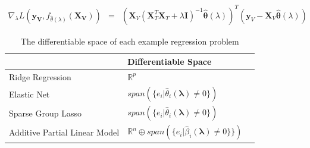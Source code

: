 \documentclass[10pt,letterpaper]{article}
\begin{document}
\begin{equation}
\begin{array} {lcl}
\nabla_{\lambda} L(\boldsymbol{y_V}, f_{\hat \theta(\lambda)}(\boldsymbol{X_V}))
&=& (\boldsymbol{X}_V(\boldsymbol{X}_T^T \boldsymbol{X}_T + \lambda \boldsymbol{I})^{-1}
\hat{\boldsymbol{\theta}}(\lambda))^T(\boldsymbol{y}_V - \boldsymbol{X}_V \hat{\boldsymbol{\theta}}(\lambda))
\end{array}
\end{equation}

\begin{table} 
\begin{center}

\begin{tabular}{| l | l | l | }
\hline
 &  Differentiable Space \\
\hline
Ridge Regression & $\mathbb{R}^p$\\
\hline
Elastic Net & $span(\{e_i | \hat{\theta}_i\left(\boldsymbol{\lambda}\right) \ne 0 \})$\\
\hline
Sparse Group Lasso & $span(\{e_i | \hat{\theta}_i\left(\boldsymbol{\lambda}\right) \ne 0 \})$ \\
\hline
Additive Partial Linear Model & $\mathbb{R}^{n} \oplus span(\{e_i | \hat{\beta}_i\left(\boldsymbol{\lambda}\right) \ne 0 \} \})$\\
\hline
\end{tabular}
\end{center}
\caption {The differentiable space of each example regression problem}
\label{table:differentiableSpace}
\end{table}
\end{document}

